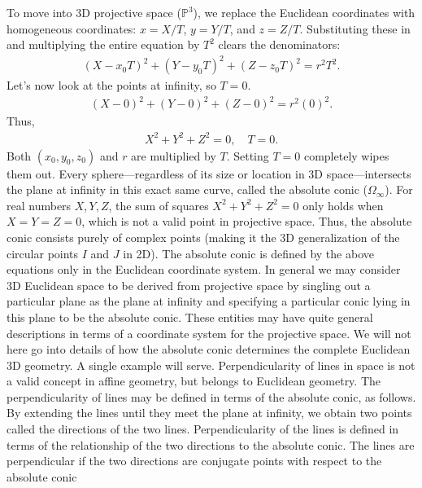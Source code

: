 \documentclass{report}
\begin{document}
\begin{itemize}
            To move into 3D projective space (\(\mathbb{P}^{3}\)), we replace the Euclidean coordinates with homogeneous coordinates: \(x = X/T\), \(y = Y/T\), and \(z = Z/T\). Substituting these in and multiplying the entire equation by \(T^{2}\) clears the denominators:
            \begin{align*}
                (X - x_{0}T)^{2} + (Y - y_{0}T)^{2} + (Z - z_{0}T)^{2} = r^{2}T^{2}
            .\end{align*}
            Let's now look at the points at infinity, so $T=0$.
            \begin{align*}
                (X - 0)^{2} + (Y-0)^{2} +(Z-0)^{2} = r^{2}(0)^{2}
            .\end{align*}
            Thus,
            \begin{align*}
                X^{2} + Y^{2} + Z^{2} = 0,\quad T = 0
            .\end{align*}
            Both \((x_0, y_0, z_0)\) and \(r\) are multiplied by \(T\). Setting \(T = 0\) completely wipes them out. Every sphere—regardless of its size or location in 3D space—intersects the plane at infinity in this exact same curve, called the absolute conic (\(\Omega _{\infty }\)).
            \bigbreak \noindent 
            For real numbers \(X, Y, Z\), the sum of squares \(X^2 + Y^2 + Z^2 = 0\) only holds when \(X = Y = Z = 0\), which is not a valid point in projective space. Thus, the absolute conic consists purely of complex points (making it the 3D generalization of the circular points \(I\) and \(J\) in 2D).
            \bigbreak \noindent 
            The absolute conic is defined by the above equations only in the Euclidean coordinate system. In general we may consider 3D Euclidean space to be derived from projective space by singling out a particular plane as the plane at infinity and specifying a particular conic lying in this plane to be the absolute conic. These entities may have quite general descriptions in terms of a coordinate system for the projective space.
            \bigbreak \noindent 
            We will not here go into details of how the absolute conic determines the complete Euclidean 3D geometry. A single example will serve. Perpendicularity of lines in space is not a valid concept in affine geometry, but belongs to Euclidean geometry.
            \bigbreak \noindent 
            The perpendicularity of lines may be defined in terms of the absolute conic, as follows. By extending the lines until they meet the plane at infinity, we obtain two points called the directions of the two lines. Perpendicularity of the lines is defined in terms of the relationship of the two directions to the absolute conic. The lines are perpendicular if the two directions are conjugate points with respect to the absolute conic

\end{itemize}
\end{document}
